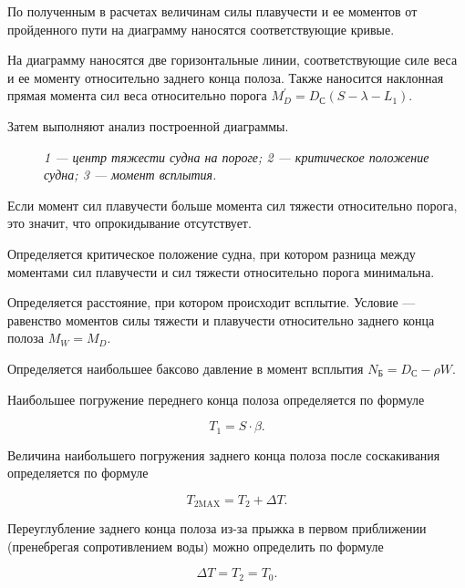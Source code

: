 По полученным в расчетах величинам силы плавучести и ее моментов от пройденного пути на диаграмму наносятся соответствующие кривые.

На диаграмму наносятся две горизонтальные линии, соответствующие силе веса и ее моменту относительно заднего конца полоза.
Также наносится наклонная прямая момента сил веса относительно порога $M_D^\prime = D_{\text{С}} (S - \lambda - L_1)$.

Затем выполняют анализ построенной диаграммы.

\begin{figure}[h!]
    \centerline{}
    \caption{Пример английской диаграммы спуска}
    \caption*{\textit{1 --- центр тяжести судна на пороге;
    2 --- критическое положение судна;
    3 --- момент всплытия.}}
    \label{fig:english-diagram}
\end{figure}

Если момент сил плавучести больше момента сил тяжести относительно порога, это значит, что опрокидывание отсутствует.

Определяется критическое положение судна, при котором разница между моментами сил плавучести и сил тяжести относительно порога минимальна.

Определяется расстояние, при котором происходит всплытие.
Условие --- равенство моментов силы тяжести и плавучести относительно заднего конца полоза $M_W = M_D$.

Определяется наибольшее баксово давление в момент всплытия $N_{\text{Б}} = D_{\text{С}} - \rho W$.

Наибольшее погружение переднего конца полоза определяется по формуле

\begin{equation}
    T_1 = S \cdot \beta.
\end{equation}

Величина наибольшего погружения заднего конца полоза после соскакивания определяется по формуле

\begin{equation}
    T_{2 \text{MAX}} = T_2 + \Delta T.
\end{equation}

Переуглубление заднего конца полоза из-за прыжка в первом приближении (пренебрегая сопротивлением воды) можно определить по формуле

\begin{equation}
    \Delta T = T_{2} = T_0.
\end{equation}
